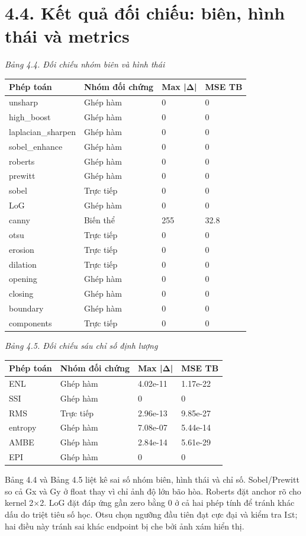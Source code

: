 \documentclass[13pt,a4paper]{extreport}
\begin{document}
\section*{4.4. Kết quả đối chiếu: biên, hình thái và metrics}
\noindent\textit{Bảng 4.4. Đối chiếu nhóm biên và hình thái}
\begin{longtable}{p{3.65cm}|p{3.65cm}|p{3.65cm}|p{3.65cm}}
Phép toán & Nhóm đối chứng & Max |Δ| & MSE TB\\\hline
unsharp & Ghép hàm & 0 & 0\\\hline
high\_boost & Ghép hàm & 0 & 0\\\hline
laplacian\_sharpen & Ghép hàm & 0 & 0\\\hline
sobel\_enhance & Ghép hàm & 0 & 0\\\hline
roberts & Ghép hàm & 0 & 0\\\hline
prewitt & Ghép hàm & 0 & 0\\\hline
sobel & Trực tiếp & 0 & 0\\\hline
LoG & Ghép hàm & 0 & 0\\\hline
canny & Biến thể & 255 & 32.8\\\hline
otsu & Trực tiếp & 0 & 0\\\hline
erosion & Trực tiếp & 0 & 0\\\hline
dilation & Trực tiếp & 0 & 0\\\hline
opening & Ghép hàm & 0 & 0\\\hline
closing & Ghép hàm & 0 & 0\\\hline
boundary & Ghép hàm & 0 & 0\\\hline
components & Trực tiếp & 0 & 0\\\hline
\end{longtable}
\noindent\textit{Bảng 4.5. Đối chiếu sáu chỉ số định lượng}
\begin{longtable}{p{3.65cm}|p{3.65cm}|p{3.65cm}|p{3.65cm}}
Phép toán & Nhóm đối chứng & Max |Δ| & MSE TB\\\hline
ENL & Ghép hàm & 4.02e-11 & 1.17e-22\\\hline
SSI & Ghép hàm & 0 & 0\\\hline
RMS & Trực tiếp & 2.96e-13 & 9.85e-27\\\hline
entropy & Ghép hàm & 7.08e-07 & 5.44e-14\\\hline
AMBE & Ghép hàm & 2.84e-14 & 5.61e-29\\\hline
EPI & Ghép hàm & 0 & 0\\\hline
\end{longtable}
Bảng 4.4 và Bảng 4.5 liệt kê sai số nhóm biên, hình thái và chỉ số. Sobel/Prewitt so cả Gx và Gy ở float thay vì chỉ ảnh độ lớn bão hòa. Roberts đặt anchor rõ cho kernel 2×2. LoG đặt đáp ứng gần zero bằng 0 ở cả hai phép tính để tránh khác dấu do triệt tiêu số học. Otsu chọn ngưỡng đầu tiên đạt cực đại và kiểm tra I≤t; hai điều này tránh sai khác endpoint bị che bởi ảnh xám hiển thị.
\end{document}
